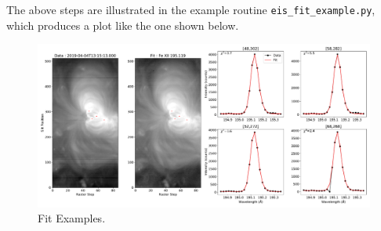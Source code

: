 The above steps are illustrated in the example routine \verb+eis_fit_example.py+, which produces a plot like the one shown below.

\begin{figure}[t]
  \centerline{\includegraphics[scale=0.25]{figures/fit_example.pdf}}
  \caption{Fit Examples.}
  \label{fig:fit_example}
\end{figure}
